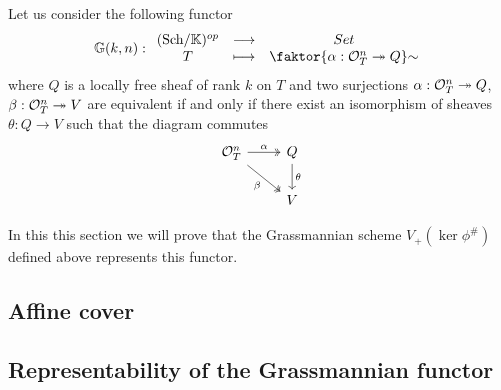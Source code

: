 Let us consider the following functor
\[\G(k,n):\funcDef{(\Sch\K)\op}{Set}{T}{\quot{\cpa{\al:\Oc_T^n\onto Q}}\sim}\]
where $Q$ is a locally free sheaf of rank $k$ on $T$ and two surjections $\alpha:\mathcal{O}_T^n\twoheadrightarrow Q$, $\beta:\mathcal{O}_T^n\twoheadrightarrow V$ are equivalent if and only if there exist an isomorphism of sheaves $\theta:Q\to V$ such that the diagram commutes
\[\begin{tikzcd}
	{\Oc_T^n} & Q \\
	& V
	\arrow["\al", two heads, from=1-1, to=1-2]
	\arrow["\beta"', two heads, from=1-1, to=2-2]
	\arrow["\theta", from=1-2, to=2-2]
\end{tikzcd}\]

\noindent In this this section we will prove that the Grassmannian scheme $V_+(\ker\phi^\#)$ defined above represents this functor.

\subsection{Affine cover}

\subsection{Representability of the Grassmannian functor}
